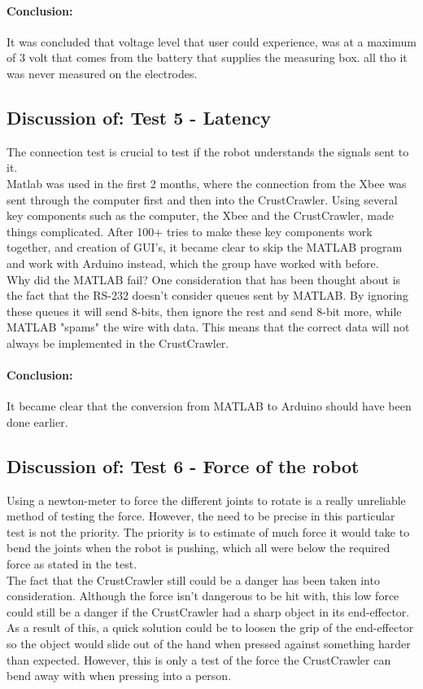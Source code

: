 \paragraph{Conclusion:}
It was concluded that voltage level that user could experience, was at a maximum of 3 volt that comes from the battery that supplies the measuring box. all tho it was never measured on the electrodes.

\subsection*{Discussion of: Test 5 - Latency}
The connection test is crucial to test if the robot understands the signals sent to it.\\
Matlab was used in the first 2 months, where the connection from the Xbee was sent through the computer first and then into the CrustCrawler. Using several key components such as the computer, the Xbee and the CrustCrawler, made things complicated. After 100+ tries to make these key components work together, and creation of GUI's, it became clear to skip the MATLAB program and work with Arduino instead, which the group have worked with before.\\
Why did the MATLAB fail? One consideration that has been thought about is the fact that the RS-232 doesn't consider queues sent by MATLAB. By ignoring these queues it will send 8-bits, then ignore the rest and send 8-bit more, while MATLAB "spams" the wire with data. This means that the correct data will not always be implemented in the CrustCrawler.
\paragraph{Conclusion:} It became clear that the conversion from MATLAB to Arduino should have been done earlier.

\subsection*{Discussion of: Test 6 - Force of the robot}
Using a newton-meter to force the different joints to rotate is a really unreliable method of testing the force. However, the need to be precise in this particular test is not the priority. The priority is to estimate of much force it would take to bend the joints when the robot is pushing, which all were below the required force as stated in the test.\\
The fact that the CrustCrawler still could be a danger has been taken into consideration. Although the force isn't dangerous to be hit with, this low force could still be a danger if the CrustCrawler had a sharp object in its end-effector. As a result of this, a quick solution could be to loosen the grip of the end-effector so the object would slide out of the hand when pressed against something harder than expected. However, this is only a test of the force the CrustCrawler can bend away with when pressing into a person.
